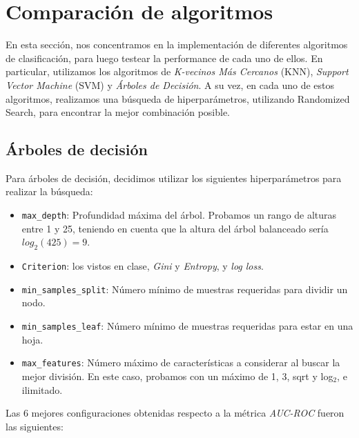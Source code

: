 \section*{Comparación de algoritmos}

En esta sección, nos concentramos en la implementación de diferentes algoritmos de clasificación, para luego testear la performance de cada uno de ellos.
En particular, utilizamos los algoritmos de \textit{K-vecinos Más Cercanos} (KNN), \textit{Support Vector Machine} (SVM) y \textit{Árboles de Decisión}. 
A su vez, en cada uno de estos algoritmos, realizamos una búsqueda de hiperparámetros, utilizando Randomized Search, para encontrar la mejor combinación
posible.

\subsection*{Árboles de decisión}
Para árboles de decisión, decidimos utilizar los siguientes hiperparámetros para realizar la búsqueda:
\begin{itemize}
    \item \texttt{max\_depth}: Profundidad máxima del árbol. Probamos un rango de alturas entre 1 y 25, teniendo en cuenta que la altura del árbol balanceado sería $log_2(425) = 9$.
    \item\texttt{Criterion}: los vistos en clase, \textit{Gini} y \textit{Entropy}, y \textit{log loss}.

    \item \texttt{min\_samples\_split}: Número mínimo de muestras requeridas para dividir un nodo.
    
    \item \texttt{min\_samples\_leaf}: Número mínimo de muestras requeridas para estar en una hoja.
    
    \item \texttt{max\_features}: Número máximo de características a considerar al buscar la mejor división. En este caso, probamos con un máximo de 1, 3, sqrt y log$_2$, e ilimitado.
\end{itemize}

Las 6 mejores configuraciones obtenidas respecto a la métrica \textit{AUC-ROC} fueron las siguientes:

